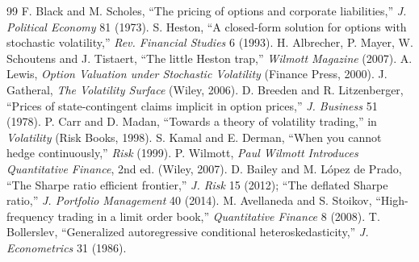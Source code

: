 \documentclass[11pt,a4paper]{article}
\begin{document}
\begin{thebibliography}{99}\small
{} F. Black and M. Scholes, ``The pricing of options and corporate liabilities,'' \emph{J. Political Economy} 81 (1973).
 S. Heston, ``A closed-form solution for options with stochastic volatility,'' \emph{Rev. Financial Studies} 6 (1993).
 H. Albrecher, P. Mayer, W. Schoutens and J. Tistaert, ``The little Heston trap,'' \emph{Wilmott Magazine} (2007).
 A. Lewis, \emph{Option Valuation under Stochastic Volatility} (Finance Press, 2000).
 J. Gatheral, \emph{The Volatility Surface} (Wiley, 2006).
 D. Breeden and R. Litzenberger, ``Prices of state-contingent claims implicit in option prices,'' \emph{J. Business} 51 (1978).
 P. Carr and D. Madan, ``Towards a theory of volatility trading,'' in \emph{Volatility} (Risk Books, 1998).
 S. Kamal and E. Derman, ``When you cannot hedge continuously,'' \emph{Risk} (1999).
 P. Wilmott, \emph{Paul Wilmott Introduces Quantitative Finance}, 2nd ed. (Wiley, 2007).
 D. Bailey and M. López de Prado, ``The Sharpe ratio efficient frontier,'' \emph{J. Risk} 15 (2012); ``The deflated Sharpe ratio,'' \emph{J. Portfolio Management} 40 (2014).
 M. Avellaneda and S. Stoikov, ``High-frequency trading in a limit order book,'' \emph{Quantitative Finance} 8 (2008).
 T. Bollerslev, ``Generalized autoregressive conditional heteroskedasticity,'' \emph{J. Econometrics} 31 (1986).
\end{thebibliography}
\end{document}
